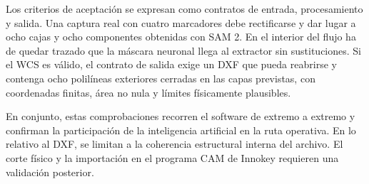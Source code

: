 Los criterios de aceptación se expresan como contratos de entrada, procesamiento y salida. Una captura real con cuatro marcadores debe rectificarse y dar lugar a ocho cajas y ocho componentes obtenidas con SAM 2. En el interior del flujo ha de quedar trazado que la máscara neuronal llega al extractor sin sustituciones. Si el WCS es válido, el contrato de salida exige un DXF que pueda reabrirse y contenga ocho polilíneas exteriores cerradas en las capas previstas, con coordenadas finitas, área no nula y límites físicamente plausibles.

En conjunto, estas comprobaciones recorren el software de extremo a extremo y confirman la participación de la inteligencia artificial en la ruta operativa. En lo relativo al DXF, se limitan a la coherencia estructural interna del archivo. El corte físico y la importación en el programa CAM de Innokey requieren una validación posterior.
